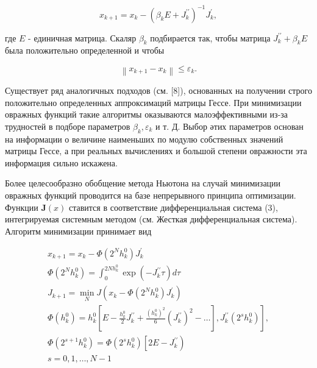 \documentclass[10pt]{article}
\begin{document}
\[

x_{k+1}=x_{k}-\left(\beta_{k} E+J_{k}^{\prime \prime}\right)^{-1} J_{k}^{\prime},

\]



где $E$ - единичная матрица. Скаляр $\beta_{k}$ подбирается так, чтобы матрица $J_{k}^{\prime \prime}+\beta_{k} E$ была положительно определенной и чтобы



\[

\left\|x_{k+1}-x_{k}\right\| \leqslant \varepsilon_{k} .

\]



Существует ряд аналогичных подходов (см. [8]), основанных на получении строго положительно определенных аппроксимаций матрицы Гессе. При минимизации овражных функций такие алгоритмы оказываются малоэффективными из-за трудностей в подборе параметров $\beta_{k}, \varepsilon_{k}$ и т. Д. Выбор әтих параметров основан на информации о величине наименьших по модулю собственных значений матрицы Гессе, а при реальных вычислениях и большой степени овражности эта информация сильно искажена.



Более целесообразно обобщение метода Ньютона на случай минимизации овражных функций проводится на базе непрерывного принципа оптимизации. Функции $\boldsymbol{J}(x)$ ставится в соответствие дифференциальная система (3), интегрируемая системным методом (см. Жесткая дифференциальная система). Алгоритм минимизации принимает вид



\[

\begin{gathered}

x_{k+1}=x_{k}-\Phi\left(2^{N} h_{k}^{0}\right) J_{k}^{\prime} \\

\Phi\left(2^{N} h_{k}^{0}\right)=\int_{0}^{2 N h_{k}^{0}} \exp \left(-J_{k}^{\prime \prime} \tau\right) d \tau \\

J_{k+1}=\min _{N} J\left(x_{k}-\Phi\left(2^{N} h_{k}^{0}\right) J_{k}^{\prime}\right) \\

\left.\Phi\left(h_{k}^{0}\right)=h_{k}^{0}\left[E-\frac{h_{k}^{0}}{2} J_{k}^{\prime \prime}+\frac{\left(h_{k}^{0}\right)^{2}}{6}\left(J_{k}^{\prime \prime}\right)^{2}-\ldots\right], J_{k}^{\prime \prime}\left(2^{s} h_{k}^{0}\right)\right], \\

\Phi\left(2^{s+1} h_{k}^{0}\right)=\Phi\left(2^{s} h_{k}^{0}\right)\left[2 E-J_{k}^{\prime \prime}\right) \\

s=0,1, \ldots, N-1

\end{gathered}

\]
\end{document}
